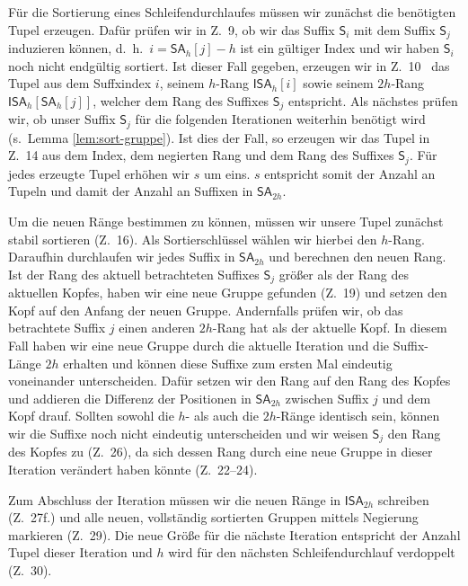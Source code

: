 Für die Sortierung eines Schleifendurchlaufes müssen wir zunächst die benötigten Tupel erzeugen. Dafür prüfen wir in Z.~9, ob wir das Suffix $\mathsf{S}_i$ mit dem Suffix $\mathsf{S}_j$ induzieren können, d.~h.\ $i = \mathsf{SA}_{h}[j]-h$ ist ein gültiger Index und wir haben $\mathsf{S}_i$ noch nicht endgültig sortiert. Ist dieser Fall gegeben, erzeugen wir in Z.~10 \ das Tupel aus dem Suffxindex $i$, seinem $h$-Rang $\mathsf{ISA}_h[i]$ sowie seinem $2h$-Rang $\mathsf{ISA}_h[\mathsf{SA}_h[j]]$, welcher dem Rang des Suffixes $\mathsf{S}_j$ entspricht. Als nächstes prüfen wir, ob unser Suffix $\mathsf{S}_j$ für die folgenden Iterationen weiterhin benötigt wird (s.~Lemma \ref{lem:sort-gruppe}). Ist dies der Fall, so erzeugen wir das Tupel in Z.~14 aus dem Index, dem negierten Rang und dem Rang des Suffixes $\mathsf{S}_j$. Für jedes erzeugte Tupel erhöhen wir $s$ um eins. $s$ entspricht somit der Anzahl an Tupeln und damit der Anzahl an Suffixen in $\mathsf{SA}_{2h}$.

Um die neuen Ränge bestimmen zu können, müssen wir unsere Tupel zunächst stabil sortieren (Z.~16). Als Sortierschlüssel wählen wir hierbei den $h$-Rang. Daraufhin durchlaufen wir jedes Suffix in $\mathsf{SA}_{2h}$ und berechnen den neuen Rang. Ist der Rang des aktuell betrachteten Suffixes $\mathsf{S}_j$ größer als der Rang des aktuellen Kopfes, haben wir eine neue Gruppe gefunden (Z.~19) und setzen den Kopf auf den Anfang der neuen Gruppe. Andernfalls prüfen wir, ob das betrachtete Suffix $j$ einen anderen $2h$-Rang hat als der aktuelle Kopf. In diesem Fall haben wir eine neue Gruppe durch die aktuelle Iteration und die Suffix-Länge $2h$ erhalten und können diese Suffixe zum ersten Mal eindeutig voneinander unterscheiden. Dafür setzen wir den Rang auf den Rang des Kopfes und addieren die Differenz der Positionen in $\mathsf{SA}_{2h}$ zwischen Suffix $j$ und dem Kopf drauf. Sollten sowohl die $h$- als auch die $2h$-Ränge identisch sein, können wir die Suffixe noch nicht eindeutig unterscheiden und wir weisen $\mathsf{S}_j$ den Rang des Kopfes zu (Z.~26), da sich dessen Rang durch eine neue Gruppe in dieser Iteration verändert haben könnte (Z.~22--24).

Zum Abschluss der Iteration müssen wir die neuen Ränge in $\mathsf{ISA}_{2h}$ schreiben (Z.~27f.) und alle neuen, vollständig sortierten Gruppen mittels Negierung markieren (Z.~29). Die neue Größe für die nächste Iteration entspricht der Anzahl Tupel dieser Iteration und $h$ wird für den nächsten Schleifendurchlauf verdoppelt (Z.~30).

